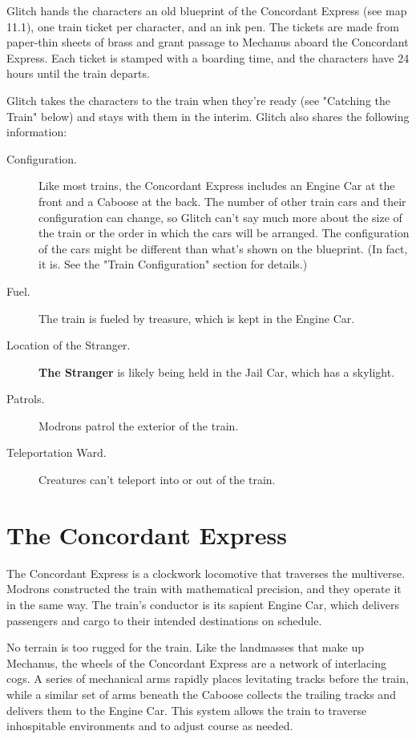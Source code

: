 \documentclass[10pt,a4paper,twoside,bg=print,twocolumn,openany,nodeprecatedcode]{dndarticle}
\begin{document}
Glitch hands the characters an old blueprint of the Concordant Express (see map 11.1), one train ticket per character, and an ink pen. The tickets are made from paper-thin sheets of brass and grant passage to Mechanus aboard the Concordant Express. Each ticket is stamped with a boarding time, and the characters have 24 hours until the train departs.

Glitch takes the characters to the train when they're ready (see "Catching the Train" below) and stays with them in the interim. Glitch also shares the following information:


\begin{description}
\item[Configuration.]
Like most trains, the Concordant Express includes an Engine Car at the front and a Caboose at the back. The number of other train cars and their configuration can change, so Glitch can't say much more about the size of the train or the order in which the cars will be arranged. The configuration of the cars might be different than what's shown on the blueprint. (In fact, it is. See the "Train Configuration" section for details.)
\item[Fuel.]
The train is fueled by treasure, which is kept in the Engine Car.
\item[Location of the Stranger.]
\textbf{The Stranger} is likely being held in the Jail Car, which has a skylight.
\item[Patrols.]
Modrons patrol the exterior of the train.
\item[Teleportation Ward.]
Creatures can't teleport into or out of the train.
\end{description}

\section{The Concordant Express}
The Concordant Express is a clockwork locomotive that traverses the multiverse. Modrons constructed the train with mathematical precision, and they operate it in the same way. The train's conductor is its sapient Engine Car, which delivers passengers and cargo to their intended destinations on schedule.

No terrain is too rugged for the train. Like the landmasses that make up Mechanus, the wheels of the Concordant Express are a network of interlacing cogs. A series of mechanical arms rapidly places levitating tracks before the train, while a similar set of arms beneath the Caboose collects the trailing tracks and delivers them to the Engine Car. This system allows the train to traverse inhospitable environments and to adjust course as needed.
\end{document}
